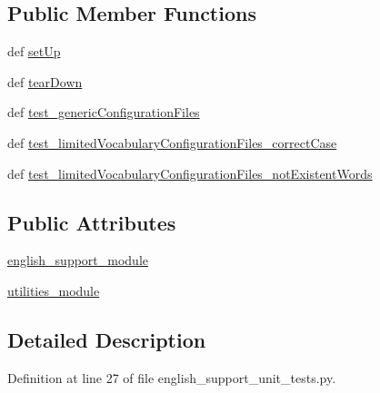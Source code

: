 \subsection*{Public Member Functions}
\begin{DoxyCompactItemize}
\item 
def \hyperlink{classenglish__support__unit__tests_1_1TestAudioProcessing_a0c4275044a58bff1192579b87c86f71c}{set\-Up}
\item 
def \hyperlink{classenglish__support__unit__tests_1_1TestAudioProcessing_abddf049b5dbfd26903167694abab5506}{tear\-Down}
\item 
def \hyperlink{classenglish__support__unit__tests_1_1TestAudioProcessing_a49fe0076ebda8e012abf9e79d28b4049}{test\-\_\-generic\-Configuration\-Files}
\item 
def \hyperlink{classenglish__support__unit__tests_1_1TestAudioProcessing_aac1fc989bb8c79cf941f54febabe3f39}{test\-\_\-limited\-Vocabulary\-Configuration\-Files\-\_\-correct\-Case}
\item 
def \hyperlink{classenglish__support__unit__tests_1_1TestAudioProcessing_a0baa86921674f6631da9ac2c13f1d0ed}{test\-\_\-limited\-Vocabulary\-Configuration\-Files\-\_\-not\-Existent\-Words}
\end{DoxyCompactItemize}
\subsection*{Public Attributes}
\begin{DoxyCompactItemize}
\item 
\hyperlink{classenglish__support__unit__tests_1_1TestAudioProcessing_a382b4b85899f9b39d213de0ba1ab85d2}{english\-\_\-support\-\_\-module}
\item 
\hyperlink{classenglish__support__unit__tests_1_1TestAudioProcessing_a107b29275347e41f4d9b65d3934b0188}{utilities\-\_\-module}
\end{DoxyCompactItemize}


\subsection{Detailed Description}


Definition at line 27 of file english\-\_\-support\-\_\-unit\-\_\-tests.\-py.



